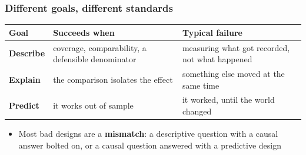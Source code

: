 \begin{frame}
\frametitle{Different goals, different standards}
\centering

\vspace{5pt}
\footnotesize
\begin{tabularx}{\textwidth}{p{2.1cm}|L|L}
\textbf{Goal} & \textbf{Succeeds when} & \textbf{Typical failure} \\
\hline
\textbf{Describe} & coverage, comparability, a defensible denominator & measuring what got recorded, not what happened \\
\hline
\textbf{Explain} & the comparison isolates the effect & something else moved at the same time \\
\hline
\textbf{Predict} & it works out of sample & it worked, until the world changed \\
\end{tabularx}

\vspace{12pt}
\begin{itemize}
  \item<2-> Most bad designs are a \textbf{mismatch}: a descriptive question with a causal answer bolted on, or a causal question answered with a predictive design
\end{itemize}

\end{frame}

